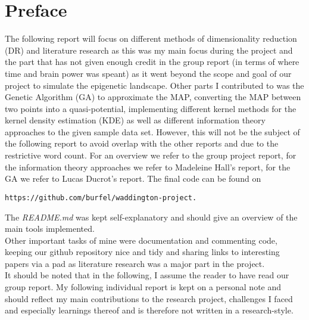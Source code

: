 \documentclass[journal, a4paper]{IEEEtran}
\begin{document}
\section{Preface}
The following report will focus on different methods of dimensionality reduction (DR) and literature research as this was my main focus during the project and the part that has not given enough credit in the group report (in terms of where time and brain power was speant) as it went beyond the scope and goal of our project to simulate the epigenetic landscape.
Other parts I contributed to was the Genetic Algorithm (GA) to approximate the MAP, converting the MAP between two points into a quasi-potential, implementing different kernel methods for the kernel density estimation (KDE) as well as different information theory approaches to the given sample data set. However, this will not be the subject of the following report to avoid overlap with the other reports and due to the restrictive word count. For an overview we refer to the group project report, for the information theory approaches we refer to Madeleine Hall's report, for the GA we refer to Lucas Ducrot's report. The final code can be found on \begin{verbatim}
https://github.com/burfel/waddington-project.
\end{verbatim}	
The \textit{README.md} was kept self-explanatory and should give an overview of the main tools implemented. \\
Other important tasks of mine were documentation and commenting code, keeping our github repository nice and tidy and sharing links to interesting papers via a pad as literature research was a major part in the project. \\

It should be noted that in the following, I assume the reader to have read our group report. My following individual report is kept on a personal note and should reflect my main contributions to the research project, challenges I faced and especially learnings thereof and is therefore not written in a research-style. 


	

\end{document}
